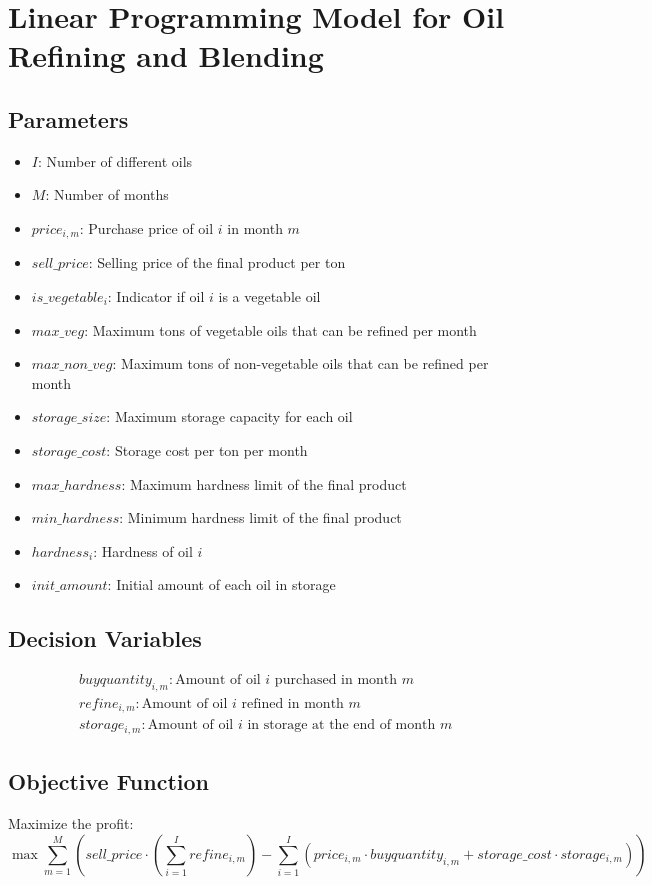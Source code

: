 \documentclass{article}
\begin{document}
\section*{Linear Programming Model for Oil Refining and Blending}

\subsection*{Parameters}
\begin{itemize}
    \item $I$: Number of different oils
    \item $M$: Number of months
    \item $price_{i,m}$: Purchase price of oil $i$ in month $m$
    \item $sell\_price$: Selling price of the final product per ton
    \item $is\_vegetable_i$: Indicator if oil $i$ is a vegetable oil
    \item $max\_veg$: Maximum tons of vegetable oils that can be refined per month
    \item $max\_non\_veg$: Maximum tons of non-vegetable oils that can be refined per month
    \item $storage\_size$: Maximum storage capacity for each oil
    \item $storage\_cost$: Storage cost per ton per month
    \item $max\_hardness$: Maximum hardness limit of the final product
    \item $min\_hardness$: Minimum hardness limit of the final product
    \item $hardness_{i}$: Hardness of oil $i$
    \item $init\_amount$: Initial amount of each oil in storage
\end{itemize}

\subsection*{Decision Variables}
\begin{align*}
    &buyquantity_{i,m}: \text{Amount of oil $i$ purchased in month $m$} \\
    &refine_{i,m}: \text{Amount of oil $i$ refined in month $m$} \\
    &storage_{i,m}: \text{Amount of oil $i$ in storage at the end of month $m$}
\end{align*}

\subsection*{Objective Function}
Maximize the profit:
\[
\max \sum_{m=1}^{M} \left( sell\_price \cdot \left( \sum_{i=1}^{I} refine_{i,m} \right) - \sum_{i=1}^{I} (price_{i,m} \cdot buyquantity_{i,m} + storage\_cost \cdot storage_{i,m}) \right)
\]
\end{document}
